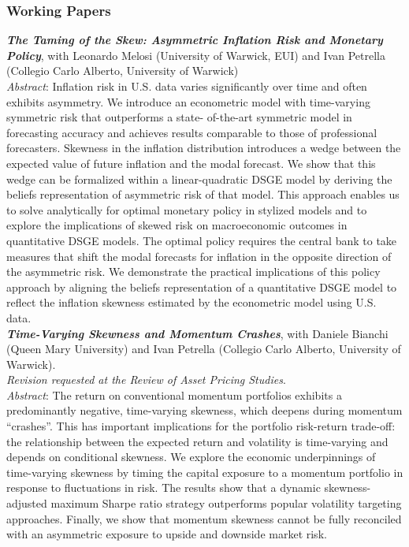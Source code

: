 \documentclass[a4paper,12pt]{article}
\begin{document}
\subsubsection*{Working Papers}
\textit{\textbf{The Taming of the Skew: Asymmetric Inflation Risk and Monetary Policy}}, with Leonardo Melosi (University of Warwick, EUI) and Ivan Petrella (Collegio Carlo Alberto, University of Warwick)\\[.5em]
\textit{Abstract}: Inflation risk in U.S. data varies significantly over time and often exhibits asymmetry. We introduce an econometric model with time-varying symmetric risk that outperforms a state-
of-the-art symmetric model in forecasting accuracy and achieves results comparable to those of professional forecasters. Skewness in the inflation distribution introduces a wedge between the expected value of future inflation and the modal forecast. We show that this wedge can be formalized within a linear-quadratic DSGE model by deriving the beliefs representation of asymmetric risk of that model. This approach enables us to solve analytically for optimal monetary policy in stylized models and to explore the implications of skewed risk on macroeconomic outcomes in quantitative DSGE models. The optimal policy requires the central bank to take measures that shift the modal forecasts for inflation in the opposite direction of the asymmetric risk. We demonstrate the practical implications of this policy approach by aligning the beliefs representation of a quantitative DSGE model to reflect the inflation
skewness estimated by the econometric model using U.S. data.\\[.5em]

\textit{\textbf{Time-Varying Skewness and Momentum Crashes}}, with Daniele Bianchi (Queen Mary University) and Ivan Petrella (Collegio Carlo Alberto, University of Warwick).\\\textit{Revision requested at the Review of Asset Pricing Studies}.\\[.5em]\textit{Abstract}:
The return on conventional momentum portfolios exhibits a predominantly negative, time-varying skewness, which deepens during momentum ``crashes''. This has important implications for the portfolio risk-return trade-off: the relationship between the expected return and volatility is time-varying and depends on conditional skewness. We explore the economic underpinnings of time-varying skewness by timing the capital exposure to a momentum portfolio in response to fluctuations in risk. The results show that a dynamic skewness-adjusted maximum Sharpe ratio strategy outperforms popular volatility targeting approaches. Finally, we show that momentum skewness cannot be fully reconciled with an asymmetric exposure to upside and downside market risk.\\[.5em]
\end{document}
